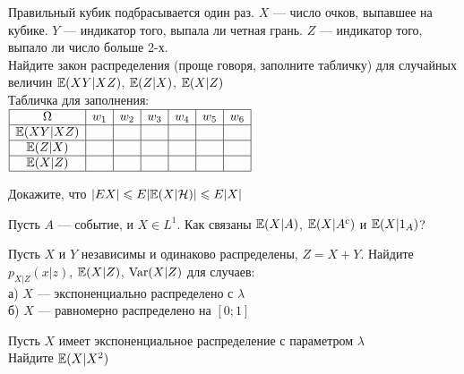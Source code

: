 \begin{solution}
\begin{solution}
\begin{solution}
\begin{solution}
\begin{solution}
\begin{solution}
\begin{solution}
\begin{problem}
 Правильный кубик подбрасывается один раз. $X$ --- число очков, выпавшее на кубике. $Y$ --- индикатор того, выпала ли четная грань. $Z$ --- индикатор того, выпало ли число больше 2-х. \\
Найдите закон распределения (проще говоря, заполните табличку) для случайных величин $\mathbb{E}(XY|XZ)$, $\mathbb{E}(Z|X)$, $\mathbb{E}(X|Z)$ \\
Табличка для заполнения: \\
$\begin{array}{|c|c|c|c|c|c|c|} 
\hline
\Omega & w_{1} & w_{2} & w_{3} & w_{4} & w_{5} & w_{6} \\
\hline
\mathbb{E}(XY|XZ) & & & & & & \\
\hline
\mathbb{E}(Z|X) & & & & & & \\
\hline
\mathbb{E}(X|Z) & & & & & & \\
\hline
\end{array}$
\end{problem} 
\begin{solution} 

\end{solution}

\begin{problem}
Докажите, что $|EX|\leqslant E|\mathbb{E}(X|\mathcal{H})|\leqslant E|X|$ 
\end{problem} 
\begin{solution} 

\end{solution}

\begin{problem}
Пусть $A$ --- событие, и $X\in L^{1}$. Как связаны $\mathbb{E}(X|A)$,
$\mathbb{E}(X|A^{c})$ и $\mathbb{E}(X|1_{A})$? 
\end{problem} 
\begin{solution} 

\end{solution}

\begin{problem}
Пусть $X$ и $Y$ независимы и одинаково распределены, $Z=X+Y$. Найдите $p_{X|Z}(x|z)$, $\mathbb{E}(X|Z)$, $\operatorname{Var}(X|Z)$ для случаев: \\
а) $X$ --- экспоненциально распределено с $\lambda$ \\
б) $X$ --- равномерно распределено на $[0;1]$
\end{problem} 
\begin{solution} 

\end{solution}

\begin{problem}
Пусть $X$ имеет экспоненциальное распределение с параметром $\lambda$ \\
Найдите $\mathbb{E}(X|X^{2})$ 
\end{problem} 
\begin{solution} 


\end{solution}
\end{solution}
\end{solution}
\end{solution}
\end{solution}
\end{solution}
\end{solution}
\end{solution}
